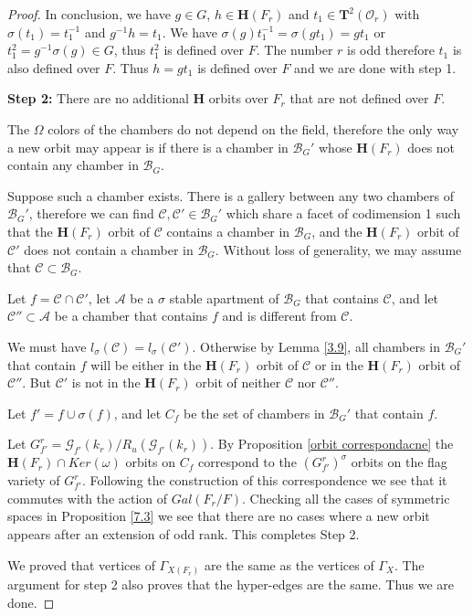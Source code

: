 \documentclass[12pt]{article}
\newcommand{\A}{\mathcal{A}}
\newcommand{\B}{\mathcal{B}}
\newcommand{\C}{\mathcal{C}}
\newcommand{\s}{\mathcal{O}}
\newcommand{\<}{\langle}
\renewcommand{\>}{\rangle}
\theoremstyle{plain}
\theoremstyle{definition}
\begin{document}
\begin{proof}
In conclusion, we have $g\in G$, $h\in \mathbf{H}(F_r)$ and $t_1\in \mathbf{T}^2(\s_r)$ with $\sigma(t_1)=t^{-1}_1$ and $g^{-1}h=t_1$. We have $\sigma(g)t_1^{-1}=\sigma(gt_1)=gt_1$ or $t^2_1=g^{-1}\sigma(g)\in G$, thus $t^2_1$ is defined over $F$. The number $r$ is odd therefore $t_1$ is also defined over $F$. Thus $h=gt_1$ is defined over $F$ and we are done with step 1. 

\textbf{Step 2:} There are no additional $\mathbf{H}$ orbits over $F_r$ that are not defined over $F$.

The $\Omega$ colors of the chambers do not depend on the field, therefore the only way a new orbit may appear is if there is a chamber in $\B_G'$ whose $\mathbf{H}(F_r)$ does not contain any chamber in $\B_G$.

Suppose such a chamber exists. There is a gallery between any two chambers of $\B_G'$, therefore we can find $\C,\C'\in \B_G'$ which share a facet of codimension 1 such that the $\mathbf{H}(F_r)$ orbit of $\C$ contains a chamber in $\B_G$, and the $\mathbf{H}(F_r)$ orbit of $\C'$ does not contain a chamber in $\B_G$. Without loss of generality, we may assume that $\C\subset \B_G$.  

 Let $f=\C\cap \C'$, let $\A$ be a $\sigma$ stable apartment of $\B_G$ that contains $\C$, and let $\C''\subset \A$ be a chamber that contains $f$ and is different from $\C$. 
 
 We must have $l_\sigma(\C)=l_\sigma(\C')$. Otherwise by Lemma \ref{3.9}, all chambers in $\B_G'$ that contain $f$ will be either in the $\mathbf{H}(F_r)$ orbit of $\C$ or in the $\mathbf{H}(F_r)$ orbit of $\C''$. But $\C'$ is not in the $\mathbf{H}(F_r)$ orbit of neither $\C$ nor $\C''$.

 Let $f'=f\cup \sigma(f)$, and let $C_f$ be the set of chambers in $\B_G'$ that contain $f$.
 
 Let $G^r_{f'}={\mathcal G}_{f'}(k_r)/R_u({\mathcal G}_{f'}(k_r))$. By Proposition \ref{orbit correspondacne} the $\mathbf{H}(F_r)\cap Ker(\omega)$ orbits on $C_f$ correspond to the $(G^r_{f'})^\sigma$ orbits on the flag variety of $G^r_{f'}$. Following the construction of this correspondence we see that it commutes with the action of $Gal(F_r/F)$. Checking all the cases of symmetric spaces in Proposition \ref{7.3} we see that there are no cases where a new orbit appears after an extension of odd rank. This completes Step 2.
 
We proved that vertices of $\Gamma_{X(F_r)}$ are the same as the vertices of $\Gamma_X$. The argument for step 2 also proves that the hyper-edges are the same. Thus we are done.
\end{proof}
\end{document}
